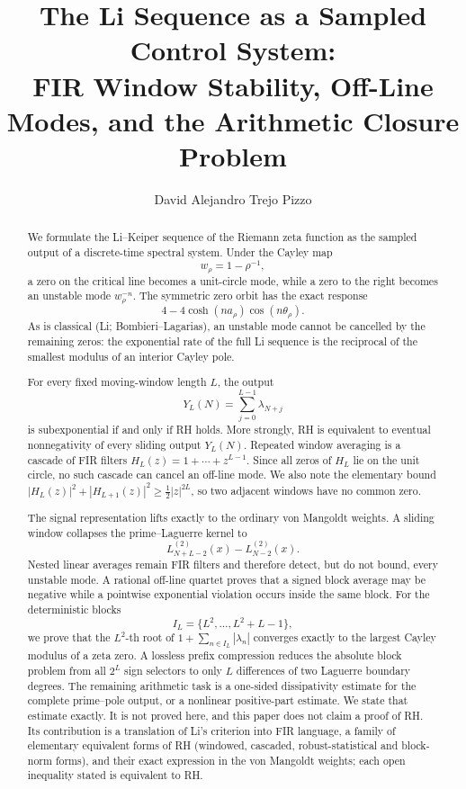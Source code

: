 \documentclass[11pt]{amsart}
\title[The Li sequence as a sampled control system]
{The Li Sequence as a Sampled Control System:\\
FIR Window Stability, Off-Line Modes, and the Arithmetic Closure Problem}
\author{David Alejandro Trejo Pizzo}
\numberwithin{equation}{section}
\theoremstyle{definition}
\theoremstyle{remark}
\begin{document}
\begin{abstract}
We formulate the Li--Keiper sequence of the Riemann zeta function as the
sampled output of a discrete-time spectral system. Under the Cayley map
\[
 w_\rho=1-\rho^{-1},
\]
a zero on the critical line becomes a unit-circle mode, while a zero to the
right becomes an unstable mode \(w_\rho^{-n}\). The symmetric zero orbit has
the exact response
\[
 4-4\cosh(na_\rho)\cos(n\theta_\rho).
\]
As is classical (Li; Bombieri--Lagarias), an unstable mode cannot be
cancelled by the remaining zeros: the exponential rate of the full Li
sequence is the reciprocal of the smallest modulus of an interior Cayley
pole.

For every fixed moving-window length \(L\), the output
\[
 Y_L(N)=\sum_{j=0}^{L-1}\lambda_{N+j}
\]
is subexponential if and only if RH holds. More strongly, RH is equivalent
to eventual nonnegativity of every sliding output \(Y_L(N)\). Repeated
window averaging is a cascade of FIR filters
\(H_L(z)=1+\cdots+z^{L-1}\). Since all zeros of \(H_L\) lie on the unit
circle, no such cascade can cancel an off-line mode. We also note the
elementary bound
\(|H_L(z)|^2+|H_{L+1}(z)|^2\ge \tfrac12|z|^{2L}\), so two adjacent windows
have no common zero.

The signal representation lifts exactly to the ordinary von Mangoldt
weights. A sliding window collapses the prime--Laguerre kernel to
\[
 L_{N+L-2}^{(2)}(x)-L_{N-2}^{(2)}(x).
\]
Nested linear averages remain FIR filters and therefore detect, but do not
bound, every unstable mode. A rational off-line quartet proves that a
signed block average may be negative while a pointwise exponential
violation occurs inside the same block. For the deterministic blocks
\[
 I_L=\{L^2,\ldots,L^2+L-1\},
\]
we prove that the \(L^2\)-th root of
\(1+\sum_{n\in I_L}|\lambda_n|\) converges exactly to the largest Cayley
modulus of a zeta zero. A lossless prefix compression reduces the
absolute block problem from all \(2^L\) sign selectors to only \(L\)
differences of two Laguerre boundary degrees. The remaining arithmetic task
is a one-sided dissipativity estimate for the complete prime--pole output,
or a nonlinear positive-part estimate. We state that estimate exactly. It
is not proved here, and this paper does not claim a proof of RH. Its
contribution is a translation of Li's criterion into FIR language, a family
of elementary equivalent forms of RH (windowed, cascaded,
robust-statistical and block-norm forms), and their exact expression in the
von Mangoldt weights; each open inequality stated is equivalent to RH.
\end{abstract}
\maketitle
\end{document}
